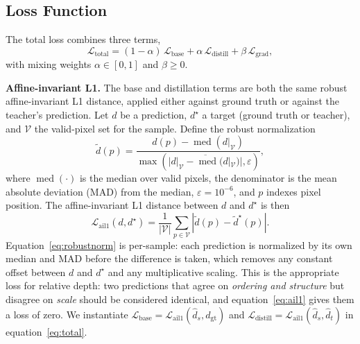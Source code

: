 \documentclass[10pt,twocolumn,letterpaper]{article}
\begin{document}
\subsection{Loss Function}
\label{sec:loss}

The total loss combines three terms,
\begin{equation}
\mathcal{L}_{\text{total}} = (1-\alpha)\, \mathcal{L}_{\text{base}}
    + \alpha\, \mathcal{L}_{\text{distill}}
    + \beta\, \mathcal{L}_{\text{grad}},
\label{eq:total}
\end{equation}
with mixing weights $\alpha \in [0,1]$ and $\beta \ge 0$.

\textbf{Affine-invariant L1.} The base and distillation terms are both
the same robust affine-invariant L1 distance, applied either against
ground truth or against the teacher's prediction. Let $d$ be a
prediction, $d^{\star}$ a target (ground truth or teacher), and
$\mathcal{V}$ the valid-pixel set for the sample. Define the robust
normalization
\begin{equation}
\tilde d(p) = \frac{d(p) - \operatorname{med}(d|_{\mathcal{V}})}{\max(\overline{|d|_{\mathcal{V}}-\operatorname{med}(d|_{\mathcal{V}})|}, \varepsilon)},
\label{eq:robustnorm}
\end{equation}
where $\operatorname{med}(\cdot)$ is the median over valid pixels,
the denominator is the mean absolute deviation (MAD) from the median,
$\varepsilon=10^{-6}$, and $p$ indexes pixel position. The
affine-invariant L1 distance between $d$ and $d^{\star}$ is then
\begin{equation}
\mathcal{L}_{\text{ail1}}(d, d^{\star}) = \frac{1}{|\mathcal{V}|}\sum_{p\in\mathcal{V}}\left|\tilde d(p) - \tilde{d}^{\star}(p)\right|.
\label{eq:ail1}
\end{equation}
Equation~\eqref{eq:robustnorm} is per-sample: each prediction is
normalized by its own median and MAD before the difference is taken,
which removes any constant offset between $d$ and $d^{\star}$ and any
multiplicative scaling. This is the appropriate loss for relative depth:
two predictions that agree on \emph{ordering and structure} but disagree
on \emph{scale} should be considered identical, and equation~\eqref{eq:ail1}
gives them a loss of zero. We instantiate
$\mathcal{L}_{\text{base}} = \mathcal{L}_{\text{ail1}}(\hat d_s, d_{\text{gt}})$
and $\mathcal{L}_{\text{distill}} = \mathcal{L}_{\text{ail1}}(\hat d_s, \hat d_t)$
in equation~\eqref{eq:total}.
\end{document}
